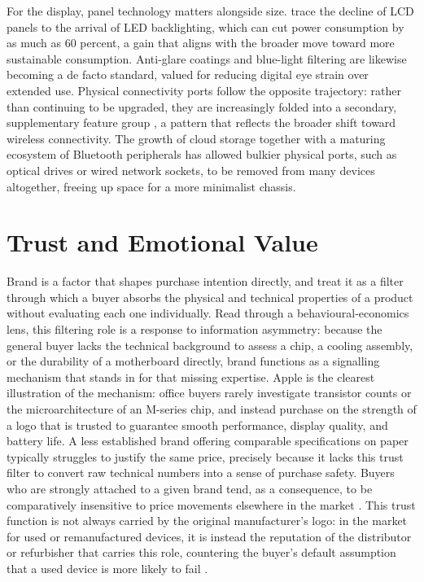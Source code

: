 For the display, panel technology matters alongside size. \textcite{liao_determinants_2022}
trace the decline of LCD panels to the arrival of LED backlighting, which can cut power
consumption by as much as 60 percent, a gain that aligns with the broader move toward more
sustainable consumption. Anti-glare coatings and blue-light filtering are likewise becoming
a de facto standard, valued for reducing digital eye strain over extended use. Physical
connectivity ports follow the opposite trajectory: rather than continuing to be upgraded,
they are increasingly folded into a secondary, supplementary feature group
\parencite{sonmez_cakir_determination_2020}, a pattern that reflects the broader shift
toward wireless connectivity. The growth of cloud storage together with a maturing
ecosystem of Bluetooth peripherals has allowed bulkier physical ports, such as optical
drives or wired network sockets, to be removed from many devices altogether, freeing up
space for a more minimalist chassis.

\section{Trust and Emotional Value}\label{app:theory-trust}

Brand is a factor that shapes purchase intention directly, and
\textcite{sonmez_cakir_determination_2020} treat it as a filter through which a buyer
absorbs the physical and technical properties of a product without evaluating each one
individually. Read through a behavioural-economics lens, this filtering role is a response
to information asymmetry: because the general buyer lacks the technical background to
assess a chip, a cooling assembly, or the durability of a motherboard directly, brand
functions as a signalling mechanism that stands in for that missing expertise. Apple is
the clearest illustration of the mechanism: office buyers rarely investigate transistor
counts or the microarchitecture of an M-series chip, and instead purchase on the strength
of a logo that is trusted to guarantee smooth performance, display quality, and battery
life. A less established brand offering comparable specifications on paper typically
struggles to justify the same price, precisely because it lacks this trust filter to
convert raw technical numbers into a sense of purchase safety. Buyers who are strongly
attached to a given brand tend, as a consequence, to be comparatively insensitive to price
movements elsewhere in the market \parencite{rau_optimal_2018}. This trust function is not
always carried by the original manufacturer's logo: in the market for used or
remanufactured devices, it is instead the reputation of the distributor or refurbisher that
carries this role, countering the buyer's default assumption that a used device is more
likely to fail \parencite{jimenez-parra_key_2014}.


